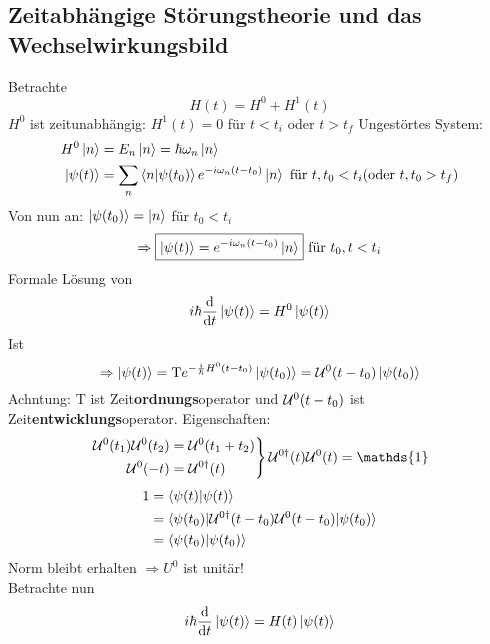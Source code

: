 	\subsection{Zeitabhängige Störungstheorie und das Wechselwirkungsbild}
	Betrachte 
		\begin{equation*}
			H(t) = H^0 + H^1 (t)
		\end{equation*}
	$H^0$ ist zeitunabhängig: $H^1(t) = 0$ für $t < t_i$ oder $t > t_f$
	Ungestörtes System: 
		\begin{align*}
			H^0 \ket{n} &= E_n \ket{n} = \hbar \omega_n \ket{n} \\
			\ket{\psi(t)} &= \sum_n \braket{n | \psi(t_0)} e^{-i \omega_n (t-t_0)} \ket{n} \text{~für~} t, t_0 < t_i (\text{oder~} t, t_0 > t_f)
		\end{align*}
	Von nun an: $\ket{\psi(t_0)} = \ket{n}$ für $t_0 < t_i$
		\begin{equation*}
			\Rightarrow \boxed{\ket{\psi (t)} = e^{-i \omega_n (t-t_0)} \ket{n}
			} \text{~für~} t_0, t < t_i
		\end{equation*}		
	Formale Lösung von 
		\begin{equation*}
			i \hbar \frac{\mathrm{d}}{\mathrm{d} t} \ket{\psi(t)}
			= H^0 \ket{\psi(t)}
		\end{equation*}			
	Ist
		\begin{equation*}
			\Rightarrow \ket{\psi(t)} = \mathrm{T} e^{-\frac{i}{\hbar} H^0 (t-t_0)} 
			\ket{\psi(t_0)} = \mathcal{U}^0(t-t_0) \ket{\psi(t_0)}
		\end{equation*}
	Achntung: T ist Zeit\textbf{ordnungs}operator und $\mathcal{U}^0(t-t_0)$ ist Zeit\textbf{entwicklungs}operator.
	Eigenschaften:
		\begin{align*}
			\left.
			\begin{aligned}
				\U^0(t_1) \U^0(t_2) &= \U^0(t_1 + t_2) \\
				\U^0(-t) &= \U^{0\dagger} (t)		
			\end{aligned}
			\right\} \U^{0\dagger} (t) \U^0 (t) = \mathds{1}
		\end{align*}
		\begin{align*}
			1 &= \braket{\psi(t) | \psi(t)} \\
			&= \braket{\psi(t_0) | \mathcal{U}^{0 \dagger} (t-t_0) \mathcal{U}^0 (t-t_0) | \psi(t_0)} \\
			&= \braket{\psi(t_0) | \psi(t_0)}
		\end{align*}
	Norm bleibt erhalten $\Rightarrow U^0$ ist unitär! \\
	Betrachte nun 
		\begin{equation*}
			i \hbar \frac{\mathrm{d}}{\mathrm{d} t} \ket{\psi(t)} = H(t) \ket{\psi(t)}
		\end{equation*}
